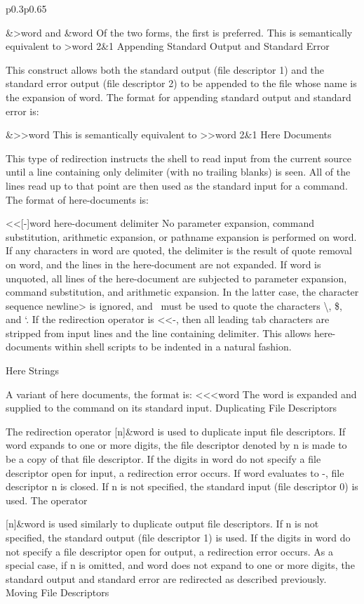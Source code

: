 \documentclass[11pt]{article}
\begin{document}
\begin{longtable}{p{}p{}}
{{{&>word
and
\&word
Of the two forms, the first is preferred. This is semantically equivalent to
>word 2\&1
Appending Standard Output and Standard Error

This construct allows both the standard output (file descriptor 1) and the standard error output (file descriptor 2) to be appended to the file whose name is the expansion of word.
The format for appending standard output and standard error is:

&>>word
This is semantically equivalent to
>>word 2\&1
Here Documents

This type of redirection instructs the shell to read input from the current source until a line containing only delimiter (with no trailing blanks) is seen. All of the lines read up to that point are then used as the standard input for a command.
The format of here-documents is:

<<[-]word
        here-document
delimiter
No parameter expansion, command substitution, arithmetic expansion, or pathname expansion is performed on word. If any characters in word are quoted, the delimiter is the result of quote removal on word, and the lines in the here-document are not expanded. If word is unquoted, all lines of the here-document are subjected to parameter expansion, command substitution, and arithmetic expansion. In the latter case, the character sequence \<newline> is ignored, and \ must be used to quote the characters \textbackslash, \$, and `.
If the redirection operator is <<-, then all leading tab characters are stripped from input lines and the line containing delimiter. This allows here-documents within shell scripts to be indented in a natural fashion.

Here Strings

A variant of here documents, the format is:
<<<word
The word is expanded and supplied to the command on its standard input.
Duplicating File Descriptors

The redirection operator
[n]\&word
is used to duplicate input file descriptors. If word expands to one or more digits, the file descriptor denoted by n is made to be a copy of that file descriptor. If the digits in word do not specify a file descriptor open for input, a redirection error occurs. If word evaluates to -, file descriptor n is closed. If n is not specified, the standard input (file descriptor 0) is used.
The operator

[n]\&word
is used similarly to duplicate output file descriptors. If n is not specified, the standard output (file descriptor 1) is used. If the digits in word do not specify a file descriptor open for output, a redirection error occurs. As a special case, if n is omitted, and word does not expand to one or more digits, the standard output and standard error are redirected as described previously.
Moving File Descriptors

}}}
\end{longtable}
\end{document}
